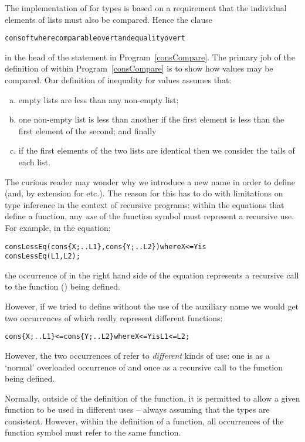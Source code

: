 \begin{aside}
The implementation of  for  types is based on a requirement that the individual elements of lists must also be compared. Hence the clause
\begin{alltt}
cons of \pcent{}t where comparable over t and equality over t
\end{alltt}
in the head of the   statement in Program~\vref{consCompare}. The primary job of the definition of \q{<} within Program~\vref{consCompare} is to show how  values may be compared. Our definition of inequality for  values assumes that:
\begin{enumerate}[a.]
\item empty lists are less than any non-empty list;
\item one non-empty list is less than another if the first element is less than the first element of the second; and finally
\item if the first elements of the two lists are identical then we consider the tails of each list.
\end{enumerate}
\begin{aside}
The curious reader may wonder why we introduce a new name  in order to define \q{<=} (and, by extension  for \q{<} etc.). The reason for this has to do with limitations on type inference in the context of recursive programs: within the equations that define a function, any \emph{use} of the function symbol must represent a recursive use. For example, in the equation:
\begin{alltt}
consLessEq(cons\{X;..L1\},cons\{Y;..L2\}) where X<=Y is
    consLessEq(L1,L2);
\end{alltt}
the occurrence of  in the right hand side of the equation represents a recursive call to the function () being defined.

However, if we tried to define \q{<=} without the use of the auxiliary name we would get two occurrences of \q{<=} which really represent different functions:
\begin{alltt}
cons\{X;..L1\} <= cons\{Y;..L2\} where X<=Y is L1 <= L2;
\end{alltt}
However, the two occurrences of \q{<=} refer to \emph{different} kinds of use: one is as a `normal' overloaded occurrence of \q{<=} and once as a recursive call to the function being defined.

Normally, outside of the definition of the function, it is permitted to allow a given function to be used in different uses -- always assuming that the types are consistent. However, within the definition of a function, all occurrences of the function symbol must refer to the same function.


\end{aside}
\end{aside}
